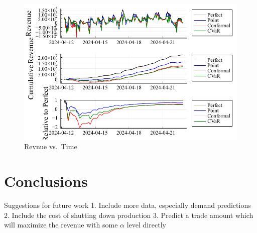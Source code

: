 \documentclass[
  journal,
]{IEEEtran}%
\begin{document}
\begin{figure}

{\centering \includegraphics{EnergyProdConformalLSTM_files/mediabag/EnergyProdConformalLSTM_files/figure-pdf/revenue-plots-output-1.pdf}

}

\caption{Revnue vs.~Time}

\end{figure}%

\section{Conclusions}\label{conclusions}

Suggestions for future work 1. Include more data, especially demand
predictions 2. Include the cost of shutting down production 3. Predict a
trade amount which will maximize the revenue with some \(\alpha\) level
directly


\ifCLASSOPTIONcaptionsoff
  \newpage
\fi



\pagebreak[3]
\end{document}
